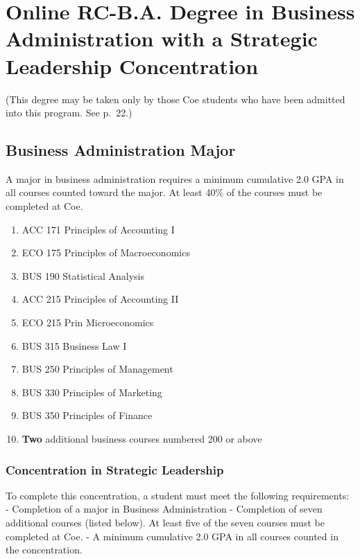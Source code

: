 \documentclass[
  letterpaper,
]{scrbook}
\providecommand{\tightlist}{%
  \setlength{\itemsep}{0pt}\setlength{\parskip}{0pt}}
\begin{document}
\section{Online RC-B.A. Degree in Business Administration with a
Strategic Leadership
Concentration}\label{online-rc-b.a.-degree-in-business-administration-with-a-strategic-leadership-concentration}

(This degree may be taken only by those Coe students who have been
admitted into this program. See p.~22.)

\subsection{Business Administration
Major}\label{business-administration-major-1}

A major in business administration requires a minimum cumulative 2.0 GPA
in all courses counted toward the major. At least 40\% of the courses
must be completed at Coe.

\begin{enumerate}
\def\labelenumi{\arabic{enumi}.}
\tightlist
\item
  ACC 171 Principles of Accounting I
\item
  ECO 175 Principles of Macroeconomics
\item
  BUS 190 Statistical Analysis
\item
  ACC 215 Principles of Accounting II
\item
  ECO 215 Prin Microeconomics
\item
  BUS 315 Business Law I
\item
  BUS 250 Principles of Management
\item
  BUS 330 Principles of Marketing
\item
  BUS 350 Principles of Finance
\item
  \textbf{Two} additional business courses numbered 200 or above
\end{enumerate}

\subsubsection{Concentration in Strategic
Leadership}\label{concentration-in-strategic-leadership}

To complete this concentration, a student must meet the following
requirements: - Completion of a major in Business Administration -
Completion of seven additional courses (listed below). At least five of
the seven courses must be completed at Coe. - A minimum cumulative 2.0
GPA in all courses counted in the concentration.
\end{document}
